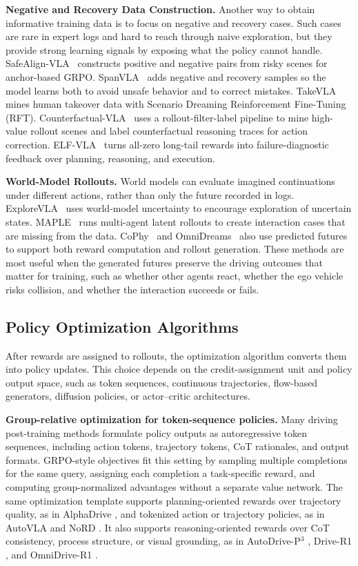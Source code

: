 \documentclass[runningheads]{llncs}
\begin{document}
\textbf{Negative and Recovery Data Construction.}
Another way to obtain informative training data is to focus on negative and recovery cases. Such cases are rare in expert logs and hard to reach through naive exploration, but they provide strong learning signals by exposing what the policy cannot handle. SafeAlign-VLA~\cite{safealignvla2026} constructs positive and negative pairs from risky scenes for anchor-based GRPO. SpanVLA~\cite{spanvla2026} adds negative and recovery samples so the model learns both to avoid unsafe behavior and to correct mistakes. TakeVLA~\cite{takevla2026} mines human takeover data with Scenario Dreaming Reinforcement Fine-Tuning (RFT). Counterfactual-VLA~\cite{peng2026counterfactual} uses a rollout-filter-label pipeline to mine high-value rollout scenes and label counterfactual reasoning traces for action correction. ELF-VLA~\cite{elfvla2026} turns all-zero long-tail rewards into failure-diagnostic feedback over planning, reasoning, and execution.

\textbf{World-Model Rollouts.}
World models can evaluate imagined continuations under different actions, rather than only the future recorded in logs.  ExploreVLA~\cite{explorevla2026} uses world-model uncertainty to encourage exploration of uncertain states. MAPLE~\cite{maple2026} runs multi-agent latent rollouts to create interaction cases that are missing from the data. CoPhy~\cite{cophy2026} and OmniDreams~\cite{omnidreams2026} also use predicted futures to support both reward computation and rollout generation. These methods are most useful when the generated futures preserve the driving outcomes that matter for training, such as whether other agents react, whether the ego vehicle risks collision, and whether the interaction succeeds or fails.

\subsection{Policy Optimization Algorithms}
\label{sec:algorithms}
After rewards are assigned to rollouts, the optimization algorithm converts them into policy updates. This choice depends on the credit-assignment unit and policy output space, such as token sequences, continuous trajectories, flow-based generators, diffusion policies, or actor--critic architectures.

\textbf{Group-relative optimization for token-sequence policies.}
Many driving post-training methods formulate policy outputs as autoregressive token sequences, including action tokens, trajectory tokens, CoT rationales, and output formats. GRPO-style objectives fit this setting by sampling multiple completions for the same query, assigning each completion a task-specific reward, and computing group-normalized advantages without a separate value network. The same optimization template supports planning-oriented rewards over trajectory quality, as in AlphaDrive \cite{alphadrive2025}, and tokenized action or trajectory policies, as in AutoVLA \cite{autovla2025} and NoRD \cite{nord2026}. It also supports reasoning-oriented rewards over CoT consistency, process structure, or visual grounding, as in AutoDrive-P$^3$ \cite{autodrivep3_2026}, Drive-R1 \cite{li2026drive}, and OmniDrive-R1  \cite{zhang2026omnidrive}.
\end{document}
